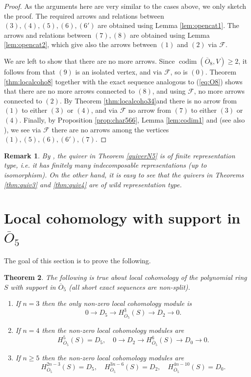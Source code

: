 \documentclass[11pt,reqno]{amsart}
\newcommand{\mc}[1]{\mathcal{#1}}
\newcommand{\ol}[1]{\overline{#1}}
\newcommand{\op}[1]{\operatorname{#1}}
\newtheorem{theorem}{Theorem}[section]
\newtheorem{remark}[theorem]{Remark}
\numberwithin{equation}{section}
\begin{document}
\begin{proof}
As the arguments here are very similar to the cases above, we only sketch the proof. The required arrows and relations between $(3), (4), (5), (6), (6')$ are obtained using Lemma \ref{lem:opencat1}. The arrows and relations between $(7), (8)$ are obtained using Lemma \ref{lem:opencat2}, which give also the arrows between $(1)$ and $(2)$ via $\mc{F}$. 


We are left to show that there are no more arrows. Since $\op{codim}(\ol{O}_8, V) \geq 2$, it follows from \cite[Lemma 2.4]{binary} that $(9)$ is an isolated vertex, and via $\mc{F}$, so is $(0)$. Theorem \ref{thm:localcoho8} together with the exact sequence analogous to (\ref{eq:O8}) shows that there are no more arrows connected to $(8)$, and using $\mc{F}$, no more arrows connected to $(2)$. By Theorem \ref{thm:localcoho34}and \cite[Lemma 3.11]{lHorincz2019categories} there is no arrow from $(1)$ to either $(3)$ or $(4)$, and via $\mc{F}$ no arrow from $(7)$ to either $(3)$ or $(4)$. Finally, by Proposition \ref{prop:char566}, Lemma \ref{lem:codim1} and \cite[Theorem 6.7]{macvil} (see also \cite{kk}), we see via $\mc{F}$ there are no arrows among the vertices $(1), (5), (6), (6'), (7)$.
\end{proof}

\begin{remark}\label{rem:reptype}
By \cite[Theorem 2.13]{lHorincz2019categories}, the quiver in Theorem \ref{quiverN5} is of finite representation type, i.e. it has finitely many indecomposable representations (up to isomorphism). On the other hand, it is easy to see that the quivers in Theorems \ref{thm:quiv3} and \ref{thm:quiv4} are of wild representation type.
\end{remark}


\section{Local cohomology with support in $\ol{O}_5$}\label{sec:o5}

The goal of this section is to prove the following.

\begin{theorem}\label{loc05}
The following is true about local cohomology of the polynomial ring $S$ with support in $\ol{O}_5$ (all short exact sequences are non-split).	
\begin{enumerate}
\item If $n=3$ then the only non-zero local cohomology module is
$$
0\to D_5 \to H^3_{\ol{O}_5}(S)\to D_2\to 0.
$$
\item If $n=4$ then the non-zero local cohomology modules are	
$$
H^5_{\ol{O}_5}(S)=D_5,\quad 0\to D_2\to H^6_{\ol{O}_5}(S)\to D_0 \to 0.
$$
\item If $n\geq 5$ then the non-zero local cohomology modules are \
$$
H^{2n-3}_{\ol{O}_5}(S)=D_5,\quad H^{3n-6}_{\ol{O}_5}(S)=D_2,\quad H^{4n-10}_{\ol{O}_5}(S)=D_0.
$$
\end{enumerate}
\end{theorem}
\end{document}

